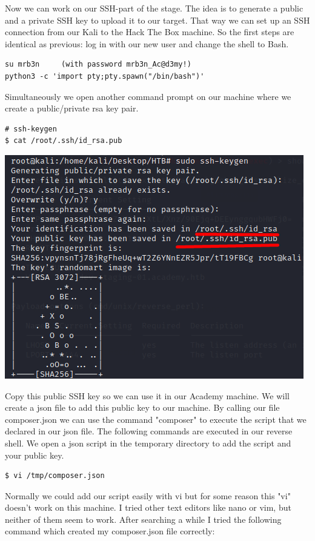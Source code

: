 \documentclass[../main.tex]{subfiles}
\begin{document}
Now we can work on our SSH-part of the stage. The idea is to generate a public and a private SSH key to upload it to our target. That way we can set up an SSH connection from our Kali to the Hack The Box machine. So the first steps are identical as previous: log in with our new user and change the shell to Bash.

\begin{lstlisting}
su mrb3n     (with password mrb3n_Ac@d3my!)
python3 -c 'import pty;pty.spawn("/bin/bash")'
\end{lstlisting}

Simultaneously we open another command prompt on our machine where we create a public/private rsa key pair.

\begin{lstlisting}
# ssh-keygen
$ cat /root/.ssh/id_rsa.pub
\end{lstlisting}

\begin{center}
\includegraphics[width=0.8\linewidth]{images/Robbe/Academy_root3.png}
\end{center}

Copy this public SSH key so we can use it in our Academy machine. We will create a json file to add this public key to our machine. By calling our file composer.json we can use the command "composer" to execute the script that we declared in our json file. The following commands are executed in our reverse shell. We open a json script in the temporary directory to add the script and your public key.

\begin{lstlisting}
$ vi /tmp/composer.json
\end{lstlisting}
Normally we could add our script easily with vi but for some reason this "vi" doesn't work on this machine. I tried other text editors like nano or vim, but neither of them seem to work. After searching a while I tried the following command which created my composer.json file correctly:
\end{document}
